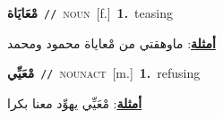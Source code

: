 \documentclass[10pt,a4paper,twoside]{article} %
\begin{document}
\begin{multicols}{2}
{\setlength\topsep{0pt}\textbf{\foreignlanguage{arabic}{مْعَايَاة}}\ {\color{gray}\texttt{//}\color{black}}\ \textsc{noun}\ [f.]\ \textbf{1.}~teasing\  \begin{flushright}\color{gray}\foreignlanguage{arabic}{\textbf{\underline{\foreignlanguage{arabic}{أمثلة}}}: ماوهقتي من مْعاياة محمود ومحمد}\end{flushright}\color{black}} \vspace{2mm}

{\setlength\topsep{0pt}\textbf{\foreignlanguage{arabic}{مْعَيِّي}}\ {\color{gray}\texttt{//}\color{black}}\ \textsc{noun\textunderscore act}\ [m.]\ \textbf{1.}~refusing\  \begin{flushright}\color{gray}\foreignlanguage{arabic}{\textbf{\underline{\foreignlanguage{arabic}{أمثلة}}}: مْعَيِّي يهوِّد معنا بكرا}\end{flushright}\color{black}} \vspace{2mm}

\end{multicols}
\end{document}
